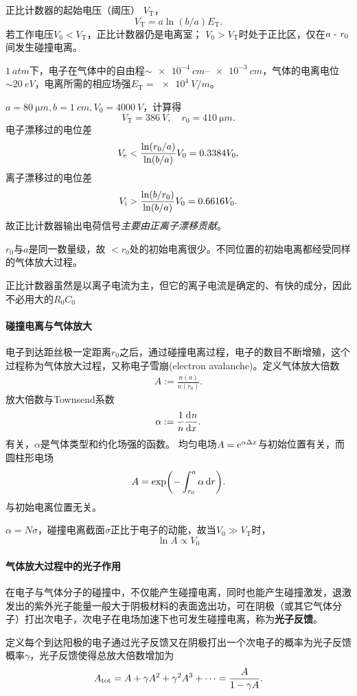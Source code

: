 正比计数器的起始电压（阈压） $V_{\mathrm T}$，
\[
	V_{\mathrm T}=a\ln(b/a)E_{\mathrm T}.
\]
若工作电压$V_0<V_\mathrm T$，正比计数器仍是电离室；
$V_0>V_\mathrm T$时处于正比区，仅在$a~\text{-}~ r_0$间发生碰撞电离。
\begin{example}{}{}
	$\SI{1}{atm}$下，电子在气体中的自由程$\sim\SIrange{e-4}{e-3}{cm}$，气体的电离电位$\sim\SI{20}{eV}$，电离所需的相应场强$E_\mathrm T=\SI{e4}{V/m}$。

	$a=\SI{80}{\micro m},b=\SI{1}{cm},V_0=\SI{4000}{V}$，计算得
	\[
		V_\mathrm T=\SI{386}{V},\quad r_0=\SI{410}{\micro m}.
	\]
	电子漂移过的电位差
	\[
		V_\mathrm e<\frac{\ln(r_0/a)}{\ln(b/a)}V_0=0.3384V_0,
	\]
	离子漂移过的电位差
	\[
		V_{\mathrm{i}}>\frac{\ln(b/r_0)}{\ln(b/a)}V_0=0.6616V_0.
	\]
	故正比计数器输出电荷信号\textit{主要由正离子漂移贡献}。
\end{example}
$r_0$与$a$是同一数量级，故%
$<r_0$处的初始电离很少。不同位置的初始电离都经受同样的气体放大过程。%

正比计数器虽然是以离子电流为主，但它的离子电流是确定的、有快的成分，因此不必用大的$R_0C_0$
\paragraph{碰撞电离与气体放大}
电子到达距丝极一定距离$r_0$之后，通过碰撞电离过程，电子的数目不断增殖，这个过程称为气体放大过程，又称电子雪崩(electron avalanche)。定义气体放大倍数
\begin{align}
	A:=\frac{n(a)}{n(r_0)}.
\end{align}
放大倍数与Townsend系数
\[
	\alpha:=\frac1n\frac{\mathrm{d}^{{}}n}{\mathrm{d}{x}^{{}}}.
\]
有关，$\alpha$是气体类型和约化场强的函数。
\newpage
均匀电场$A=\mathop{}\!\mathrm{e}^{\alpha\Delta x}$与初始位置有关，而圆柱形电场
\[
	A=\exp\biggl(-\int_{r_0}^a\alpha\mathop{}\!\mathrm{d} r\biggr).
\]
与初始电离位置无关。

$\alpha=N\sigma$，碰撞电离截面$\sigma$正比于电子的动能，故当$V_0\gg V_\mathrm T$时，
\[
	\ln A\propto V_0
\]
\paragraph{气体放大过程中的光子作用}
在电子与气体分子的碰撞中，不仅能产生碰撞电离，同时也能产生碰撞激发，退激发出的紫外光子能量一般大于阴极材料的表面逸出功，可在阴极（或其它气体分子）打出次电子，次电子在电场加速下也可发生碰撞电离，称为\textbf{光子反馈}。

定义每个到达阳极的电子通过光子反馈又在阴极打出一个次电子的概率为光子反馈概率$\gamma$，光子反馈使得总放大倍数增加为
\[
	A_\mathrm{tot}=A+\gamma A^2+\gamma^2A^3+\cdots=\frac A{1-\gamma A}.
\]

